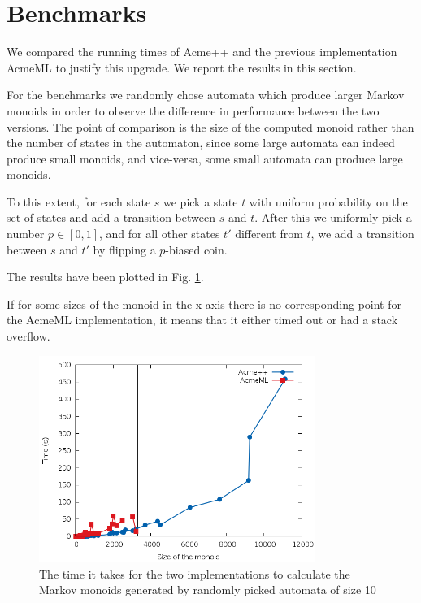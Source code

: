 \section{Benchmarks}
We compared the running times of Acme++ and the previous
implementation AcmeML to justify this upgrade. We report the results
in this section.

For the benchmarks we randomly chose automata which produce larger
Markov monoids in order to observe the difference in performance
between the two versions. The point of comparison is the size of the
computed monoid rather than the number of states in the automaton,
since some large automata can indeed produce small monoids, and
vice-versa, some small automata can produce large monoids.

To this extent, for each state $s$ we pick a state $t$ with uniform
probability on the set of states and add a transition between $s$ and
$t$. After this we uniformly pick a number $p\in[0,1]$, and for all
other states $t'$ different from $t$, we add a transition between $s$
and $t'$ by flipping a $p$-biased coin.

The results have been plotted in Fig. \ref{bench1}. 

If for some sizes of the monoid in the x-axis there is no
corresponding point for the AcmeML implementation, it means that it
either timed out or had a stack overflow.

\begin{figure}[h!]
  \label{bench1}
  \begin{center}
    \includegraphics[width=0.8\textwidth]{graph/lines}
    \caption{The time it takes for the two implementations to
      calculate the Markov monoids generated by randomly picked
      automata of size 10}
  \end{center}  
\end{figure}

